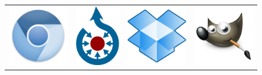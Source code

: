 \noindent
\begin{tabular}{llll}
\href{http://www.chromium.org/Home}{\includegraphics[height=100px]{img/thanks/chromium.png}} &
\href{http://commons.wikimedia.org/}{\includegraphics[height=100px]{img/thanks/commons.png}} &
\href{https://www.dropbox.com/}{\includegraphics[height=100px]{img/thanks/dropbox.png}} & 
\href{http://www.gimp.org/}{\includegraphics[height=100px]{img/thanks/gimp.png}}\\


\end{tabular}

